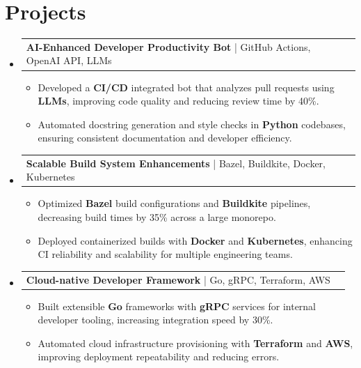 \documentclass[letterpaper,11pt]{article}
\makeatletter
\newcommand{\resumeItem}[1]{
  \item\footnotesize{
    {#1 \vspace{-2pt}}
  }
}
\newcommand{\resumeProjectHeading}[2]{
    \item
    \begin{tabular*}{1.001\textwidth}{l@{\extracolsep{\fill}}r}
      \small#1 & \textbf{\small #2}\\
    \end{tabular*}\vspace{-7pt}
}
\newcommand{\resumeSubHeadingListStart}{\begin{itemize}[leftmargin=0pt, label={}]}
\newcommand{\resumeSubHeadingListEnd}{\end{itemize}}
\newcommand{\resumeItemListStart}{\begin{itemize}[leftmargin=*]}
\newcommand{\resumeItemListEnd}{\end{itemize}\vspace{-5pt}}
\makeatother
\begin{document}
\section{Projects}
    \vspace{-5pt}
    \resumeSubHeadingListStart
      \resumeProjectHeading
          {\textbf{AI-Enhanced Developer Productivity Bot} | GitHub Actions, OpenAI API, LLMs}{}
          \resumeItemListStart
              \resumeItem{Developed a \textbf{CI/CD} integrated bot that analyzes pull requests using \textbf{LLMs}, improving code quality and reducing review time by 40\%.}
              \resumeItem{Automated docstring generation and style checks in \textbf{Python} codebases, ensuring consistent documentation and developer efficiency.}
          \resumeItemListEnd
          \vspace{-12pt}
      \resumeProjectHeading
          {\textbf{Scalable Build System Enhancements} | Bazel, Buildkite, Docker, Kubernetes}{}
          \resumeItemListStart
              \resumeItem{Optimized \textbf{Bazel} build configurations and \textbf{Buildkite} pipelines, decreasing build times by 35\% across a large monorepo.}
              \resumeItem{Deployed containerized builds with \textbf{Docker} and \textbf{Kubernetes}, enhancing CI reliability and scalability for multiple engineering teams.}
          \resumeItemListEnd
          \vspace{-12pt}
      \resumeProjectHeading
          {\textbf{Cloud-native Developer Framework} | Go, gRPC, Terraform, AWS}{}
          \resumeItemListStart
              \resumeItem{Built extensible \textbf{Go} frameworks with \textbf{gRPC} services for internal developer tooling, increasing integration speed by 30\%.}
              \resumeItem{Automated cloud infrastructure provisioning with \textbf{Terraform} and \textbf{AWS}, improving deployment repeatability and reducing errors.}
          \resumeItemListEnd 
    \resumeSubHeadingListEnd
\end{document}
